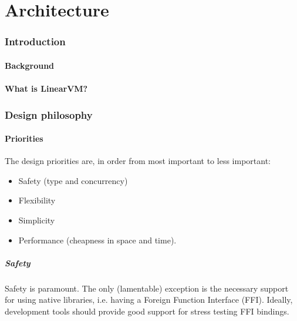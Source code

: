 \documentclass[a4paper]{book}
\begin{document}
\tableofcontents
\part{Architecture}

\section{Introduction}

\subsection{Background}


\subsection{What is LinearVM?}

\section{Design philosophy}

\subsection{Priorities}

The design priorities are, in order from most important to less important:

\begin{itemize}
\item Safety (type and concurrency)
\item Flexibility
\item Simplicity
\item Performance (cheapness in space and time).
\end{itemize}

\subsubsection*{Safety}
Safety is paramount. The only (lamentable) exception is the
necessary support for using native libraries, i.e. having a Foreign
Function Interface (FFI). Ideally, development tools should provide
good support for stress testing FFI bindings.
\end{document}

